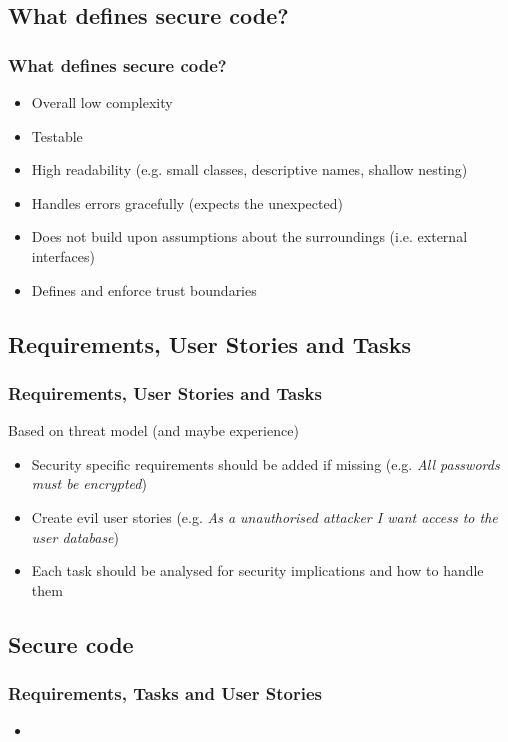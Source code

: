 \documentclass{beamer}
\begin{document}
  \subsection{What defines secure code?}
    \begin{frame}
    \frametitle{What defines secure code?}
    \begin{itemize}
      \item Overall low complexity
      \item Testable
      \item High readability (e.g. small classes, descriptive names, shallow nesting)
      \item Handles errors gracefully (expects the unexpected)
      \item Does not build upon assumptions about the surroundings (i.e. external interfaces)
      \item Defines and enforce trust boundaries
    \end{itemize}
    \end{frame}

  \subsection{Requirements, User Stories and Tasks}
    \begin{frame}
    \frametitle{Requirements, User Stories and Tasks}
    Based on threat model (and maybe experience)
    \begin{itemize}
      \item Security specific requirements should be added if missing (e.g. \textit{All passwords must be encrypted})
      \item Create evil user stories (e.g. \textit{As a unauthorised attacker I want access to the user database})
      \item Each task should be analysed for security implications and how to handle them
    \end{itemize}
    \end{frame}

  \subsection{Secure code}
    \begin{frame}
    \frametitle{Requirements, Tasks and User Stories}
    \begin{itemize}
    \item
    \end{itemize}
    \end{frame}
\end{document}
